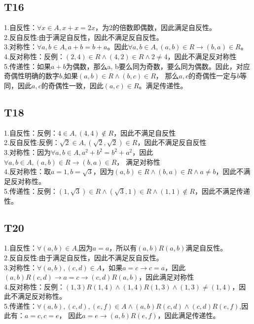 \documentclass{article}
\begin{document}
\subsection{T16}
1.自反性：$\forall x \in A, x + x = 2x$，为2的倍数即偶数，因此满足自反性。\\
2.反自反性:由于满足自反性，因此不满足反自反性。\\
3.对称性：$\forall a, b \in A, a + b = b + a$。因此$\forall a, b \in A, (a, b) \in R \rightarrow (b, a) \in R$。\\
4.反对称性：反例：$(2, 4) \in R \land (4, 2) \in R \land 2 \neq 4$，因此不满足反对称性\\
5.传递性：如果$a + b$为偶数，那么a, b要么同为奇数，要么同为偶数。因此，对应奇偶性明确的数字$b$,如果$(a,b) \in R \land (b, c) \in R$，
那么$a, c$的奇偶性一定与$b$等同，因此$a, c$的奇偶性一致，因此$(a,c)\in R$。满足传递性。
\subsection{T18}
1.自反性：反例：$4 \in A, (4, 4) \notin R$，因此不满足自反性\\
2.反自反性:反例：$\sqrt2 \in A, (\sqrt2, \sqrt2) \in R$，因此不满足反自反性\\
3.对称性：因为$\forall a, b \in A, a^2 + b^2 = b^2 + a^2$，因此$\forall a, b \in A, (a,b)\in R \rightarrow (b,a) \in R$，
满足对称性\\
4.反对称性：取$a = 1, b = \sqrt3$，因为$(a, b) \in R \land (b, a) \in R \land a\neq b$，因此不满足反对称性。\\
5.传递性：反例：$(1, \sqrt3) \in R \land (\sqrt3, 1) \in R \land (1, 1)\notin R$，因此不满足传递性。
\subsection{T20}
1.自反性：$\forall (a, b) \in A$,因为$a = a$，所以有$(a, b)R (a, b)$满足自反性。\\
2.反自反性:由于满足自反性，因此不满足反自反性。\\
3.对称性：$\forall (a, b), (c, d) \in A$，如果$ a = c \rightarrow c = a$，因此$(a, b) R (c, d) \rightarrow a = c 
\rightarrow (c, d) R (a, b)$，因此满足对称性\\
4.反对称性：反例：$(1, 3) R (1, 4) \land (1, 4) R (1, 3) \land (1, 3) \neq (1, 4)$，因此不满足反对称性。\\
5.传递性：$\forall (a, b), (c, d), (e, f) \in A \land (a, b) R (c, d) \land (c, d) R (e, f)$,因此有：$a = c, c = e$，
因此$a = e \rightarrow (a, b) R (e, f)$，因此满足传递性。
\end{document}
